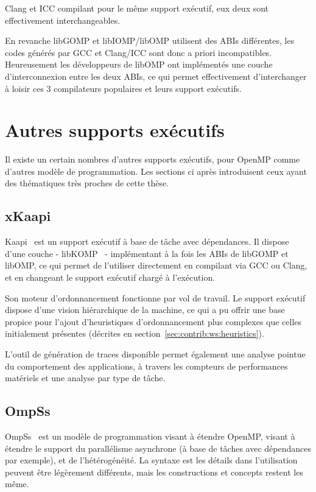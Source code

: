 Clang et ICC compilant pour le même support exécutif, eux deux sont effectivement interchangeables.

En revanche libGOMP et libIOMP/libOMP utilisent des ABIs différentes, les codes générés par GCC et Clang/ICC sont donc a priori incompatibles.
Heureusement les développeurs de libOMP ont implémentés une couche d'interconnexion entre les deux ABIs, ce qui permet effectivement d'interchanger à loisir ces 3 compilateurs populaires et leurs support exécutifs.

\section{Autres supports exécutifs}\label{sec:rw:other-runtimes}

Il existe un certain nombres d'autres supports exécutifs, pour OpenMP comme d'autres modèle de programmation.
Les sections ci après introduisent ceux ayant des thématiques très proches de cette thèse.

\subsection{xKaapi}

Kaapi~\cite{Gautier2007} est un support exécutif à base de tâche avec dépendances.
Il dispose d'une couche - libKOMP~\cite{Broquedis2012} - implémentant à la fois les ABIs de libGOMP et libOMP, ce qui permet de l'utiliser directement en compilant via GCC ou Clang, et en changeant le support exécutif chargé à l'exécution.

Son moteur d'ordonnancement fonctionne par vol de travail.
Le support exécutif dispose d'une vision hiérarchique de la machine, ce qui a pu offrir une base propice pour l'ajout d'heuristiques d'ordonnancement plus complexes que celles initialement présentes (décrites en section~\ref{sec:contrib:ws:heuristics}).

L'outil de génération de traces disponible permet également une analyse pointue du comportement des applications, à travers les compteurs de performances matériels et une analyse par type de tâche.


\subsection{OmpSs}\label{subsec:rw:ompss}

OmpSs~\cite{OMPSs} est un modèle de programmation visant à étendre OpenMP, visant à étendre le support du parallélisme asynchrone (à base de tâches avec dépendances par exemple), et de l'hétérogénéité.
La syntaxe est les détails dans l'utilisation peuvent être légèrement différents, mais les constructions et concepts restent les même.

